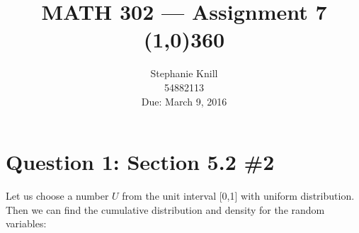 \documentclass[11pt, oneside]{article}   	%
\begin{document}
\title{MATH 302 --- Assignment 7 \\
\line(1,0){360} \\              %
}
\author{
Stephanie Knill \\
54882113 \\
Due: March 9, 2016}

\date{}                   %
\maketitle




\section*{Question 1: Section 5.2 \#2}

Let us choose a number $U$ from the unit interval [0,1] with uniform distribution. Then we can find the cumulative distribution and density for the random variables:
\end{document}
